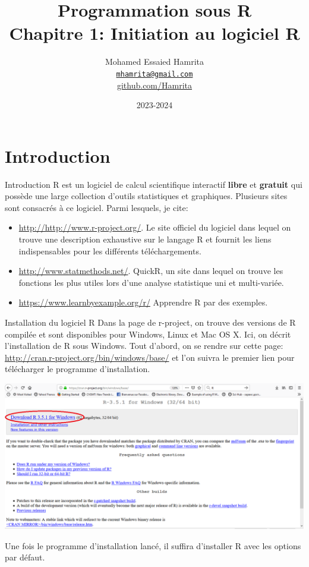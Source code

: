 \documentclass[
  8pt,
  ignorenonframetext,
]{beamer}
\title{Programmation sous R\\
Chapitre 1: Initiation au logiciel R}
\author{Mohamed Essaied Hamrita\\
\href{mailto:mhamrita@gmail.com}{\nolinkurl{mhamrita@gmail.com}}\\
\href{https:github.com/Hamrita}{github.com/Hamrita}}
\date{2023-2024}
\institute{Université de Sousse - Tunisie}
\begin{document}
\frame{\titlepage}

\begin{frame}[allowframebreaks]
  \tableofcontents[hideallsubsections]
\end{frame}
\hypertarget{introduction}{%
\section{Introduction}\label{introduction}}

\begin{frame}{Introduction}
R est un logiciel de calcul scientifique interactif \textbf{libre} et
\textbf{gratuit} qui possède une large collection d'outils statistiques
et graphiques. Plusieurs sites sont consacrés à ce logiciel. Parmi
lesquels, je cite:

\begin{itemize}
\item
  \url{http://http://www.r-project.org/}. Le site officiel du logiciel
  dans lequel on trouve une description exhaustive sur le langage R et
  fournit les liens indispensables pour les différents téléchargements.
\item
  \url{http://www.statmethods.net/}. QuickR, un site dans lequel on
  trouve les fonctions les plus utiles lors d'une analyse statistique
  uni et multi-variée.
\item
  \url{https://www.learnbyexample.org/r/} Apprendre R par des exemples.
\end{itemize}
\end{frame}

\begin{frame}{Installation du logiciel R}
\protect\hypertarget{installation-du-logiciel-r}{}
Dans la page de r-project, on trouve des versions de R compilée et sont
disponibles pour Windows, Linux et Mac OS X. Ici, on décrit
l'installation de R sous Windows. Tout d'abord, on se rendre sur cette
page: \url{http://cran.r-project.org/bin/windows/base/} et l'on suivra
le premier lien pour télécharger le programme d'installation. \pause

\begin{center}\includegraphics[width=0.8\linewidth,height=0.5\textheight]{fig1} \end{center}

\pause

Une fois le programme d'installation lancé, il suffira d'installer R
avec les options par défaut.
\end{frame}
\end{document}
